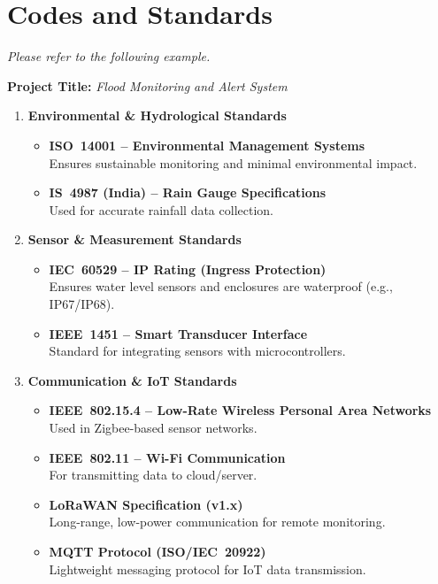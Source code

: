 \documentclass[a4paper, 11pt, oneside]{Thesis-1}
\begin{document}
\clearpage

\pagestyle{plain}

{}
\chapter*{Codes and Standards}

\noindent\textit{Please refer to the following example.}

\noindent\textbf{Project Title:} \textit{Flood Monitoring and Alert System}

\begin{enumerate}

  \item \textbf{Environmental \& Hydrological Standards}
  \begin{itemize}
    \item \textbf{ISO~14001 -- Environmental Management Systems}\\
          Ensures sustainable monitoring and minimal environmental impact.
    \item \textbf{IS~4987 (India) -- Rain Gauge Specifications}\\
          Used for accurate rainfall data collection.
  \end{itemize}

  \item \textbf{Sensor \& Measurement Standards}
  \begin{itemize}
    \item \textbf{IEC~60529 -- IP Rating (Ingress Protection)}\\
          Ensures water level sensors and enclosures are waterproof (e.g., IP67/IP68).
    \item \textbf{IEEE~1451 -- Smart Transducer Interface}\\
          Standard for integrating sensors with microcontrollers.
  \end{itemize}

  \item \textbf{Communication \& IoT Standards}
  \begin{itemize}
    \item \textbf{IEEE~802.15.4 -- Low-Rate Wireless Personal Area Networks}\\
          Used in Zigbee-based sensor networks.
    \item \textbf{IEEE~802.11 -- Wi-Fi Communication}\\
          For transmitting data to cloud/server.
    \item \textbf{LoRaWAN Specification (v1.x)}\\
          Long-range, low-power communication for remote monitoring.
    \item \textbf{MQTT Protocol (ISO/IEC~20922)}\\
          Lightweight messaging protocol for IoT data transmission.
  \end{itemize}


\end{enumerate}
\end{document}
